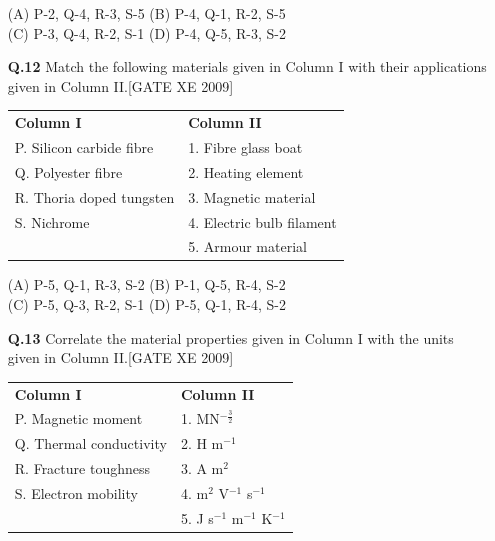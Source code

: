 \documentclass[journal,12pt,onecolumn]{IEEEtran}
\theoremstyle{remark}
\begin{document}
\begin{enumerate}
\vspace{1em}

\noindent
(A) P-2, Q-4, R-3, S-5 \hfill
(B) P-4, Q-1, R-2, S-5 \\
(C) P-3, Q-4, R-2, S-1 \hfill
(D) P-4, Q-5, R-3, S-2

\vspace{2em}

\item[\textbf{Q.12}] Match the following materials given in Column I with their applications given in Column II.\hfill[GATE XE 2009]

\vspace{1em}

\begin{tabular}{p{6cm} p{6cm}}
\textbf{Column I} & \textbf{Column II} \\
P. Silicon carbide fibre & 1. Fibre glass boat \\
Q. Polyester fibre & 2. Heating element \\
R. Thoria doped tungsten & 3. Magnetic material \\
S. Nichrome & 4. Electric bulb filament \\
& 5. Armour material \\
\end{tabular}

\vspace{1em}

\noindent
(A) P-5, Q-1, R-3, S-2 \hfill
(B) P-1, Q-5, R-4, S-2 \\
(C) P-5, Q-3, R-2, S-1 \hfill
(D) P-5, Q-1, R-4, S-2

\vspace{2em}

\item[\textbf{Q.13}] Correlate the material properties given in Column I with the units given in Column II.\hfill[GATE XE 2009]

\vspace{1em}

\begin{tabular}{p{6cm} p{6cm}}
\textbf{Column I} & \textbf{Column II} \\
P. Magnetic moment & 1. MN$^{-\tfrac{3}{2}}$ \\
Q. Thermal conductivity & 2. H m$^{-1}$ \\
R. Fracture toughness & 3. A m$^2$ \\
S. Electron mobility & 4. m$^2$ V$^{-1}$ s$^{-1}$ \\
& 5. J s$^{-1}$ m$^{-1}$ K$^{-1}$ \\
\end{tabular}


\end{enumerate}
\end{document}
